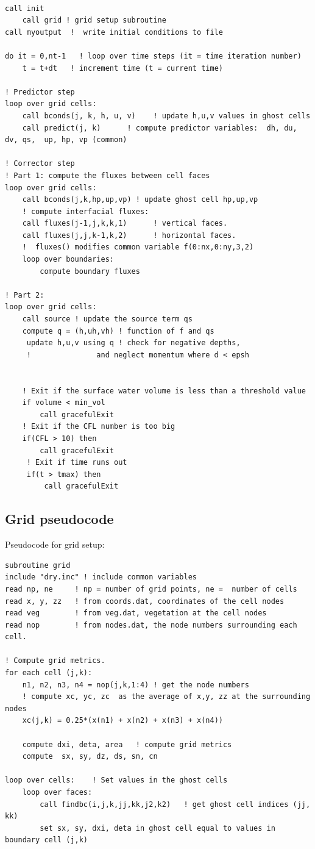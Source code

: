 \documentclass{article}
\begin{document}
\begin{lstlisting}
 
call init
	call grid ! grid setup subroutine
call myoutput  !  write initial conditions to file

do it = 0,nt-1   ! loop over time steps (it = time iteration number)
	t = t+dt   ! increment time (t = current time)

! Predictor step
loop over grid cells: 
	call bconds(j, k, h, u, v)    ! update h,u,v values in ghost cells
	call predict(j, k)      ! compute predictor variables:  dh, du, dv, qs,  up, hp, vp (common)               

! Corrector step
! Part 1: compute the fluxes between cell faces
loop over grid cells: 			  
    call bconds(j,k,hp,up,vp) ! update ghost cell hp,up,vp
    ! compute interfacial fluxes: 
    call fluxes(j-1,j,k,k,1)      ! vertical faces. 
    call fluxes(j,j,k-1,k,2)      ! horizontal faces.
    !  fluxes() modifies common variable f(0:nx,0:ny,3,2)    
	loop over boundaries:
		compute boundary fluxes
	
! Part 2: 
loop over grid cells:
	call source ! update the source term qs
	compute q = (h,uh,vh) ! function of f and qs
	 update h,u,v using q ! check for negative depths,
	 ! 				 and neglect momentum where d < epsh

     
    ! Exit if the surface water volume is less than a threshold value  
    if volume < min_vol
    	call gracefulExit
    ! Exit if the CFL number is too big
    if(CFL > 10) then
        call gracefulExit
     ! Exit if time runs out
     if(t > tmax) then
         call gracefulExit
    \end{lstlisting}


\subsection{Grid  pseudocode}
Pseudocode for grid setup: 

\begin{lstlisting}
subroutine grid
include "dry.inc" ! include common variables 
read np, ne 	! np = number of grid points, ne =  number of cells
read x, y, zz	! from coords.dat, coordinates of the cell nodes
read veg        ! from veg.dat, vegetation at the cell nodes	
read nop		! from nodes.dat, the node numbers surrounding each cell.

! Compute grid metrics.
for each cell (j,k):
	n1, n2, n3, n4 = nop(j,k,1:4) ! get the node numbers
	! compute xc, yc, zc  as the average of x,y, zz at the surrounding nodes
	xc(j,k) = 0.25*(x(n1) + x(n2) + x(n3) + x(n4))  

	compute dxi, deta, area   ! compute grid metrics
	compute  sx, sy, dz, ds, sn, cn			
	
loop over cells:	! Set values in the ghost cells
	loop over faces:	
		call findbc(i,j,k,jj,kk,j2,k2)   ! get ghost cell indices (jj, kk)
		set sx, sy, dxi, deta in ghost cell equal to values in boundary cell (j,k)
\end{lstlisting}
\end{document}
